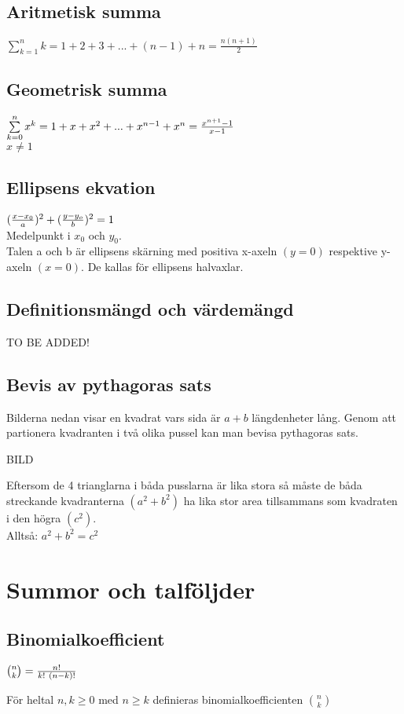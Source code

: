 \documentclass[11pt]{article}
\begin{document}
\subsection{Aritmetisk summa}
$ \sum\limits_{k=1}^{n} k=1+2+3+...+(n-1)+n = \frac{n(n+1)}{2} $

\subsection{Geometrisk summa}
$ \sum\limits_{k=0}^{n} x^k = 1+x+x^2+...+x^{n-1}+x^n= {x^{n+1} -1 \over x-1} $ \\
$ x \neq 1$

\subsection{Ellipsens ekvation}
$({x-x_0 \over a})^2 + ({y-y_o \over b})^2 = 1$ \\
Medelpunkt i $x_0 $ och $y_0$. \\
Talen a och b är ellipsens skärning med positiva x-axeln $(y=0)$ respektive y-axeln $(x=0)$. De kallas för ellipsens halvaxlar. 

\subsection{Definitionsmängd och värdemängd}
TO BE ADDED!

\subsection{Bevis av pythagoras sats}
Bilderna nedan visar en kvadrat vars sida är $a+b$ längdenheter lång. Genom att partionera kvadranten i två olika pussel kan man bevisa pythagoras sats.
\begin{center}
BILD
\end{center}
Eftersom de 4 trianglarna i båda pusslarna är lika stora så måste de båda streckande kvadranterna $(a^2 + b^2)$ ha lika stor area tillsammans som kvadraten i den högra $(c^2)$. \\
Alltså: $ a^2 + b^2 = c^2 $



\section{Summor och talföljder}
\subsection{Binomialkoefficient}
\begin{center}
$ {n \choose k} = { n!\over k!~(n-k)!} $ 
\end{center}
För heltal $ n, k \geq 0 $ med $ n \geq k$ definieras binomialkoefficienten $ {n \choose k} $
\end{document}
